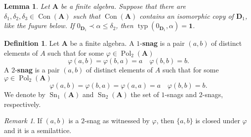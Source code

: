 \documentclass{amsart}
\theoremstyle{plain}
\newtheorem{lemma}[theorem]{Lemma}
\theoremstyle{definition}
\newtheorem{definition}[theorem]{Definition}
\theoremstyle{remark}
\newtheorem{remark}[theorem]{Remark}
\def\phi{\varphi}
\DeclareMathOperator{\Con}{Con}
\DeclareMathOperator{\Pol}{Pol}
\DeclareMathOperator{\typ}{typ}
\DeclareMathOperator{\Sn}{Sn}
\begin{document}
\begin{lemma}
    Let $\mathbf{A}$ be a finite algebra. 
    Suppose that there are $\delta_1, \delta_2, \delta_3 \in \Con(\mathbf{A})$ such that $\Con(\mathbf{A})$ contains an isomorphic copy of $\mathbf{D}_1$, 
    like the fugure below. 
    If $0_{\mathbf{D}_1} \prec \alpha \le \delta_2$, then $\typ(0_{\mathbf{D}_1}, \alpha) = \mathbf{1}$. 
    \begin{figure}
        \centering
    \end{figure}
\end{lemma}

\begin{definition}
    Let $\mathbf{A}$ be a finite algebra. 
    A $1$-\textbf{snag} is a pair $(a,b)$ of distinct elements of $A$ such that for some $\phi \in \Pol_2(\mathbf{A})$ 
    \begin{equation*}
        \phi(a,b)=\phi(b,a)=a \quad \phi(b,b)=b \text{.}
    \end{equation*}
    A $2$-\textbf{snag} is a pair $(a,b)$ of distinct elements of $A$ such that for some $\phi \in \Pol_2(\mathbf{A})$ 
    \begin{equation*}
        \phi(a,b)=\phi(b,a)=\phi(a,a)=a \quad \phi(b,b)=b \text{.}
    \end{equation*}
    We denote by $\Sn_1(\mathbf{A})$ and $\Sn_2(\mathbf{A})$ the set of $1$-snags and $2$-snags, respectively. 
\end{definition}

\begin{remark}
    If $(a,b)$ is a $2$-snag as witnessed by $\phi$, then $\{a,b\}$ is closed under $\phi$ and it is a semilattice. 
\end{remark}
\end{document}
